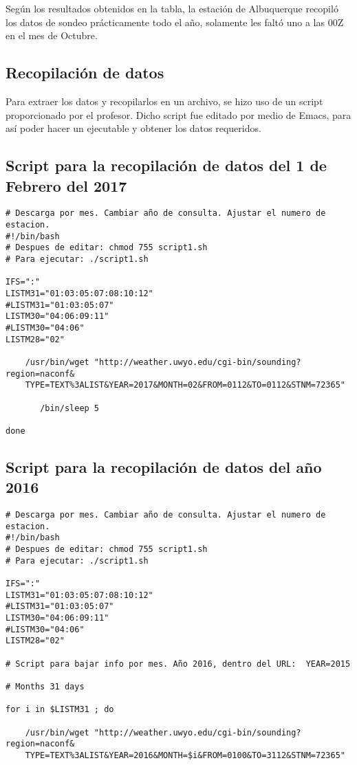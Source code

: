 \documentclass[12pt]{article}
\begin{document}
\begin{doublespace}
Según los resultados obtenidos en la tabla, la estación de Albuquerque recopiló los datos de sondeo prácticamente todo el año, solamente les faltó uno a las 00Z en el mes de Octubre.

\subsection{Recopilación de datos}
Para extraer los datos y recopilarlos en un archivo, se hizo uso de un script proporcionado por el profesor. Dicho script fue editado por medio de Emacs, para así poder hacer un ejecutable y obtener los datos requeridos.

\subsection*{Script para la recopilación de datos del 1 de Febrero del 2017}
\begin{verbatim}
# Descarga por mes. Cambiar año de consulta. Ajustar el numero de estacion.
#!/bin/bash
# Despues de editar: chmod 755 script1.sh
# Para ejecutar: ./script1.sh

IFS=":"
LISTM31="01:03:05:07:08:10:12"
#LISTM31="01:03:05:07"
LISTM30="04:06:09:11"
#LISTM30="04:06"
LISTM28="02"

    /usr/bin/wget "http://weather.uwyo.edu/cgi-bin/sounding?region=naconf&
    TYPE=TEXT%3ALIST&YEAR=2017&MONTH=02&FROM=0112&TO=0112&STNM=72365"

       /bin/sleep 5
       
done
\end{verbatim}

\subsection*{Script para la recopilación de datos del año 2016}
\begin{verbatim}
# Descarga por mes. Cambiar año de consulta. Ajustar el numero de estacion.
#!/bin/bash
# Despues de editar: chmod 755 script1.sh
# Para ejecutar: ./script1.sh

IFS=":"
LISTM31="01:03:05:07:08:10:12"
#LISTM31="01:03:05:07"
LISTM30="04:06:09:11"
#LISTM30="04:06"
LISTM28="02"

# Script para bajar info por mes. Año 2016, dentro del URL:  YEAR=2015

# Months 31 days

for i in $LISTM31 ; do

    /usr/bin/wget "http://weather.uwyo.edu/cgi-bin/sounding?region=naconf&
    TYPE=TEXT%3ALIST&YEAR=2016&MONTH=$i&FROM=0100&TO=3112&STNM=72365"


\end{verbatim}
\end{doublespace}
\end{document}
